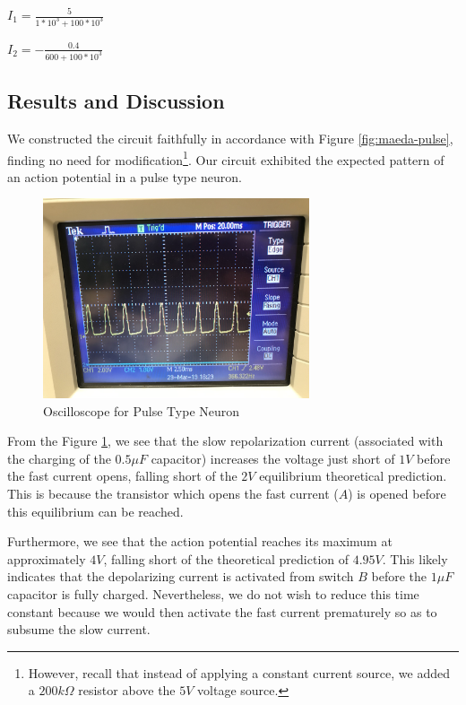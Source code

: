 \documentclass[12]{book}
\newcommand\0{\mathbf{0}}
\newcommand\<{\langle}
\renewcommand\>{\rangle}
\begin{document}
$I_1 = \frac{5}{1*10^3 + 100 * 10^3}$

$I_2 = -\frac{0.4}{600 + 100 * 10^3}$

\subsection{Results and Discussion}

We constructed the circuit faithfully in accordance with Figure \ref{fig:maeda-pulse}, finding no need for modification\footnote{However, recall that instead of applying a constant current source, we added a $200k\Omega$ resistor above the $5V$ voltage source.}. Our circuit exhibited the expected pattern of an action potential in  a pulse type neuron.

\begin{figure}[H]
\label{fig:pulse}
\centering
\includegraphics[width=0.7\textwidth]{neuron.jpeg}	
\caption{Oscilloscope for Pulse Type Neuron}
\end{figure}

From the Figure \ref{fig:pulse}, we see that the slow repolarization current (associated with the charging of the $0.5 \mu F$ capacitor) increases the voltage just short of $1 V$ before the fast current opens, falling short of the $2V$ equilibrium theoretical prediction. This is because the transistor which opens the fast current ($A$) is opened before this equilibrium can be reached.

Furthermore, we see that the action potential reaches its maximum at approximately $4 V$, falling short of the theoretical prediction of $4.95V$. This likely indicates that the depolarizing current is activated from switch $B$ before the $1 \mu F$ capacitor is fully charged. Nevertheless, we do not wish to reduce this time constant because we would then activate the fast current prematurely so as to subsume the slow current.
\end{document}
